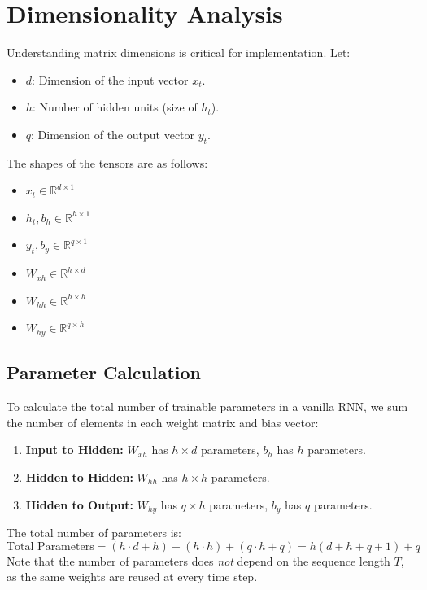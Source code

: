 \documentclass{article}
\begin{document}
\section{Dimensionality Analysis}
Understanding matrix dimensions is critical for implementation. Let:
\begin{itemize}
    \item $d$: Dimension of the input vector $x_t$.
    \item $h$: Number of hidden units (size of $h_t$).
    \item $q$: Dimension of the output vector $y_t$.
\end{itemize}

The shapes of the tensors are as follows:
\begin{itemize}
    \item $x_t \in \mathbb{R}^{d \times 1}$
    \item $h_t, b_h \in \mathbb{R}^{h \times 1}$
    \item $y_t, b_y \in \mathbb{R}^{q \times 1}$
    \item $W_{xh} \in \mathbb{R}^{h \times d}$
    \item $W_{hh} \in \mathbb{R}^{h \times h}$
    \item $W_{hy} \in \mathbb{R}^{q \times h}$
\end{itemize}

\subsection{Parameter Calculation}
To calculate the total number of trainable parameters in a vanilla RNN, we sum the number of elements in each weight matrix and bias vector:
\begin{enumerate}
    \item \textbf{Input to Hidden:} $W_{xh}$ has $h \times d$ parameters, $b_h$ has $h$ parameters.
    \item \textbf{Hidden to Hidden:} $W_{hh}$ has $h \times h$ parameters.
    \item \textbf{Hidden to Output:} $W_{hy}$ has $q \times h$ parameters, $b_y$ has $q$ parameters.
\end{enumerate}
The total number of parameters is:
\begin{equation}
\text{Total Parameters} = (h \cdot d + h) + (h \cdot h) + (q \cdot h + q) = h(d + h + q + 1) + q
\end{equation}
Note that the number of parameters does \textit{not} depend on the sequence length $T$, as the same weights are reused at every time step.
\end{document}
